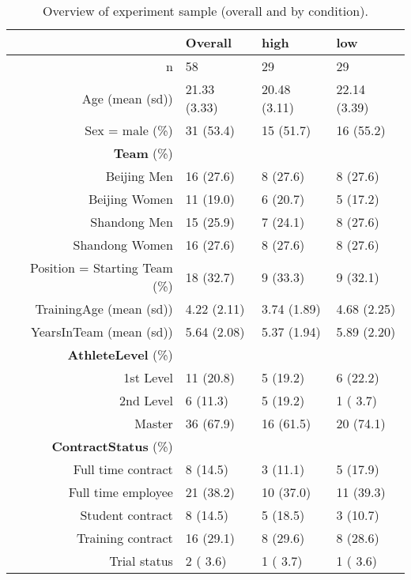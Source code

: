 \begin{table}[ht]
\centering
\begin{tabular}{rlll}
  \hline
 & Overall & high & low \\ 
  \hline
n &    58 &    29 &    29 \\ 
  Age (mean (sd)) & 21.33 (3.33) & 20.48 (3.11) & 22.14 (3.39) \\ 
  Sex = male (\%) &    31 (53.4)  &    15 (51.7)  &    16 (55.2)  \\ 
  \textbf{Team} (\%) &     &     &     \\ 
     Beijing Men &    16 (27.6)  &     8 (27.6)  &     8 (27.6)  \\ 
     Beijing Women &    11 (19.0)  &     6 (20.7)  &     5 (17.2)  \\ 
     Shandong Men &    15 (25.9)  &     7 (24.1)  &     8 (27.6)  \\ 
     Shandong Women &    16 (27.6)  &     8 (27.6)  &     8 (27.6)  \\ 
  Position = Starting Team (\%) &    18 (32.7)  &     9 (33.3)  &     9 (32.1)  \\ 
  TrainingAge (mean (sd)) &  4.22 (2.11) &  3.74 (1.89) &  4.68 (2.25) \\ 
  YearsInTeam (mean (sd)) &  5.64 (2.08) &  5.37 (1.94) &  5.89 (2.20) \\ 
  \textbf{AthleteLevel} (\%) &     &     &     \\ 
     1st Level &    11 (20.8)  &     5 (19.2)  &     6 (22.2)  \\ 
     2nd Level &     6 (11.3)  &     5 (19.2)  &     1 ( 3.7)  \\ 
     Master &    36 (67.9)  &    16 (61.5)  &    20 (74.1)  \\ 
  \textbf{ContractStatus} (\%) &     &     &     \\ 
     Full time contract &     8 (14.5)  &     3 (11.1)  &     5 (17.9)  \\ 
     Full time employee &    21 (38.2)  &    10 (37.0)  &    11 (39.3)  \\ 
     Student contract &     8 (14.5)  &     5 (18.5)  &     3 (10.7)  \\ 
     Training contract &    16 (29.1)  &     8 (29.6)  &     8 (28.6)  \\ 
     Trial status &     2 ( 3.6)  &     1 ( 3.7)  &     1 ( 3.6)  \\ 
   \hline
\end{tabular}
\caption{Overview of experiment sample (overall and by condition).} 
\label{tab:athleteDescriptivesTrainingOverall}
\end{table}
